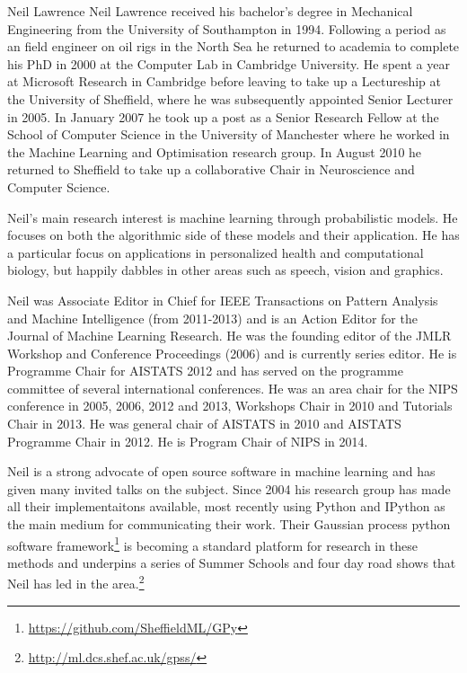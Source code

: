 \begin{participant}[type=leadPI,PM=6,salary=10000,gender=male]{Neil Lawrence}
  Neil Lawrence received his bachelor's degree in Mechanical
  Engineering from the University of Southampton in 1994. Following a
  period as an field engineer on oil rigs in the North Sea he returned
  to academia to complete his PhD in 2000 at the Computer Lab in
  Cambridge University. He spent a year at Microsoft Research in
  Cambridge before leaving to take up a Lectureship at the University
  of Sheffield, where he was subsequently appointed Senior Lecturer in
  2005. In January 2007 he took up a post as a Senior Research Fellow
  at the School of Computer Science in the University of Manchester
  where he worked in the Machine Learning and Optimisation research
  group. In August 2010 he returned to Sheffield to take up a
  collaborative Chair in Neuroscience and Computer Science.

  Neil's main research interest is machine learning through
  probabilistic models. He focuses on both the algorithmic side of
  these models and their application. He has a particular focus on
  applications in personalized health and computational biology, but
  happily dabbles in other areas such as speech, vision and graphics.

  Neil was Associate Editor in Chief for IEEE Transactions on Pattern
  Analysis and Machine Intelligence (from 2011-2013) and is an Action
  Editor for the Journal of Machine Learning Research. He was the
  founding editor of the JMLR Workshop and Conference Proceedings
  (2006) and is currently series editor. He is Programme Chair for
  AISTATS 2012 and has served on the programme committee of several
  international conferences. He was an area chair for the NIPS
  conference in 2005, 2006, 2012 and 2013, Workshops Chair in 2010 and
  Tutorials Chair in 2013. He was general chair of AISTATS in 2010 and
  AISTATS Programme Chair in 2012. He is Program Chair of NIPS in
  2014.

  Neil is a strong advocate of open source software in machine
  learning and has given many invited talks on the subject. Since 2004
  his research group has made all their implementaitons available,
  most recently using Python and IPython as the main medium for
  communicating their work. Their Gaussian process python software
  framework\footnote{\url{https://github.com/SheffieldML/GPy}} is
  becoming a standard platform for research in these methods and
  underpins a series of Summer Schools and four day road shows that
  Neil has led in the
  area.\footnote{\url{http://ml.dcs.shef.ac.uk/gpss/}}
\end{participant}

